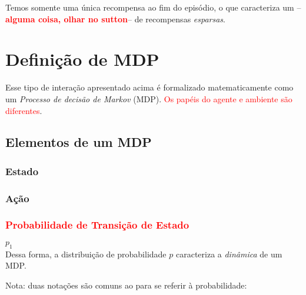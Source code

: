 \documentclass{article}
\newcommand{\todo}[1]{ --\textcolor{red}{\textbf{#1}}--}
\begin{document}
            Temos somente uma única recompensa ao fim do episódio, o que caracteriza um \todo{alguma coisa, olhar no sutton} de recompensas \emph{esparsas}.

            
    \section{Definição de MDP}
    
        Esse tipo de interação apresentado acima é formalizado matematicamente como um \emph{Processo de decisão de Markov} (MDP). \textcolor{red}{Os papéis do agente e ambiente são diferentes}.
    
        \subsection{Elementos de um MDP}
    
            \subsubsection{Estado}
            
                
            \subsubsection{Ação}
            
                
            \subsubsection{\textcolor{red}{Probabilidade de Transição de Estado}}
            
                $p_1$ \\
            
                Dessa forma, a distribuição de probabilidade $p$ caracteriza a \emph{dinâmica} de um MDP.
            
                Nota: duas notações são comuns ao para se referir à probabilidade:
                
\end{document}
